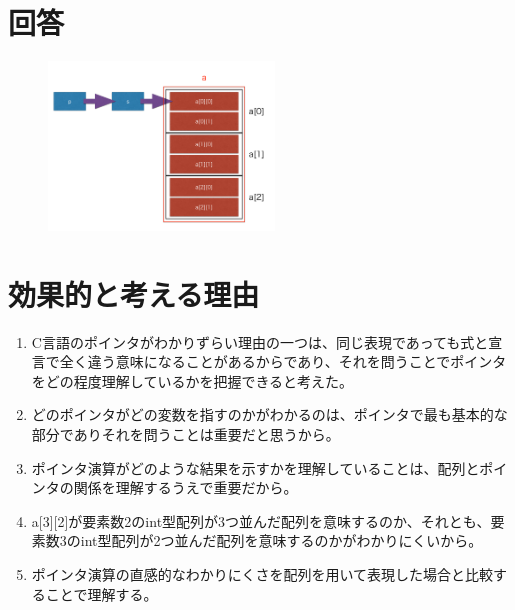 \documentclass{jsarticle}
\begin{document}
\section{回答}
\begin{figure}[H]
	\centering
	\includegraphics[width=6cm]{assign03_1}
\end{figure}%

\section{効果的と考える理由}
\begin{enumerate}
	\item C言語のポインタがわかりずらい理由の一つは、同じ表現であっても式と宣言で全く違う意味になることがあるからであり、それを問うことでポインタをどの程度理解しているかを把握できると考えた。
	\item どのポインタがどの変数を指すのかがわかるのは、ポインタで最も基本的な部分でありそれを問うことは重要だと思うから。
	\item ポインタ演算がどのような結果を示すかを理解していることは、配列とポインタの関係を理解するうえで重要だから。
	\item a[3][2]が要素数2のint型配列が3つ並んだ配列を意味するのか、それとも、要素数3のint型配列が2つ並んだ配列を意味するのかがわかりにくいから。
	\item ポインタ演算の直感的なわかりにくさを配列を用いて表現した場合と比較することで理解する。
\end{enumerate}
\end{document}
